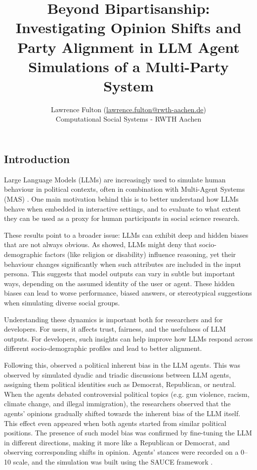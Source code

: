 \documentclass[12pt]{article}
\title{Beyond Bipartisanship: Investigating Opinion Shifts and Party Alignment in LLM Agent Simulations of a Multi-Party System}
\author{Lawrence Fulton (\url{lawrence.fulton@rwth-aachen.de})\\ Computational Social Systems -  RWTH Aachen}
\begin{document}
\maketitle

\begin{multicols}{2}


\section{Introduction}

Large Language Models (LLMs) are increasingly used to simulate human behaviour in political contexts, often in combination with Multi-Agent Systems (MAS) \cite{zhao2023competeai, kaiya2023lyfe}. One main motivation behind this is to better understand how LLMs behave when embedded in interactive settings, and to evaluate to what extent they can be used as a proxy for human participants in social science research.

These results point to a broader issue: LLMs can exhibit deep and hidden biases that are not always obvious. As  showed, LLMs might deny that socio-demographic factors (like religion or disability) influence reasoning, yet their behaviour changes significantly when such attributes are included in the input persona. This suggests that model outputs can vary in subtle but important ways, depending on the assumed identity of the user or agent. These hidden biases can lead to worse performance, biased answers, or stereotypical suggestions when simulating diverse social groups.

Understanding these dynamics is important both for researchers and for developers. For users, it affects trust, fairness, and the usefulness of LLM outputs. For developers, such insights can help improve how LLMs respond across different socio-demographic profiles and lead to better alignment.


Following this,  observed a political inherent bias in the LLM agents. This was observed by simulated dyadic and triadic discussions between LLM agents, assigning them political identities such as Democrat, Republican, or neutral. When the agents debated controversial political topics (e.g. gun violence, racism, climate change, and illegal immigration), the researchers observed that the agents’ opinions gradually shifted towards the inherent bias of the LLM itself. This effect even appeared when both agents started from similar political positions. The presence of such model bias was confirmed by fine-tuning the LLM in different directions, making it more like a Republican or Democrat, and observing corresponding shifts in opinion. Agents’ stances were recorded on a 0–10 scale, and the simulation was built using the SAUCE framework \cite{neuberger2024sauce}.



\end{multicols}
\end{document}
